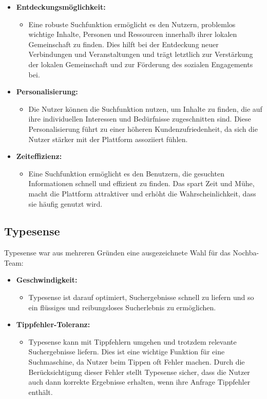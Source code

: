 \begin{itemize}
  \item \textbf{Entdeckungsmöglichkeit:}
        \begin{itemize}
          \item {Eine robuste Suchfunktion ermöglicht es den Nutzern, problemlos wichtige Inhalte, Personen und Ressourcen innerhalb ihrer lokalen Gemeinschaft zu finden. Dies hilft bei der Entdeckung neuer Verbindungen und Veranstaltungen und trägt letztlich zur Verstärkung der lokalen Gemeinschaft und zur Förderung des sozialen Engagements bei.}
        \end{itemize}
  \item \textbf{Personalisierung:}
        \begin{itemize}
          \item {Die Nutzer können die Suchfunktion nutzen, um Inhalte zu finden, die auf ihre individuellen Interessen und Bedürfnisse zugeschnitten sind. Diese Personalisierung führt zu einer höheren Kundenzufriedenheit, da sich die Nutzer stärker mit der Plattform assoziiert fühlen.}
        \end{itemize}
  \item \textbf{Zeiteffizienz:}
        \begin{itemize}
          \item {Eine Suchfunktion ermöglicht es den Benutzern, die gesuchten Informationen schnell und effizient zu finden. Das spart Zeit und Mühe, macht die Plattform attraktiver und erhöht die Wahrscheinlichkeit, dass sie häufig genutzt wird.}
        \end{itemize}
\end{itemize}

\subsection{Typesense}

Typesense war aus mehreren Gründen eine ausgezeichnete Wahl für das Nochba-Team:

\begin{itemize}
  \item \textbf{Geschwindigkeit:}
        \begin{itemize}
          \item {Typesense ist darauf optimiert, Suchergebnisse schnell zu liefern und so ein flüssiges und reibungsloses Sucherlebnis zu ermöglichen.}
        \end{itemize}
  \item \textbf{Tippfehler-Toleranz:}
        \begin{itemize}
          \item {Typesense kann mit Tippfehlern umgehen und trotzdem relevante Suchergebnisse liefern. Dies ist eine wichtige Funktion für eine Suchmaschine, da Nutzer beim Tippen oft Fehler machen. Durch die Berücksichtigung dieser Fehler stellt Typesense sicher, dass die Nutzer auch dann korrekte Ergebnisse erhalten, wenn ihre Anfrage Tippfehler enthält.}
        \end{itemize}
\end{itemize}

